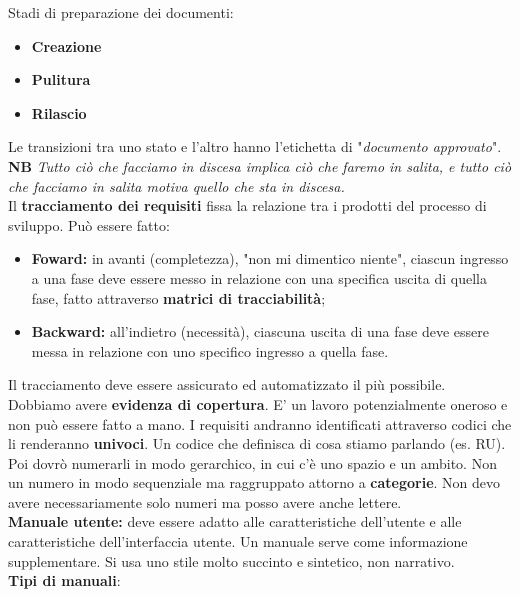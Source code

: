 Stadi di preparazione dei documenti:

\begin{itemize}

	\item \textbf{Creazione}
	\item \textbf{Pulitura}
	\item \textbf{Rilascio}

\end{itemize}

Le transizioni tra uno stato e l'altro hanno l'etichetta di "\textit{documento approvato}".\\
\textbf{NB} \textit{Tutto ciò che facciamo in discesa implica ciò che faremo in salita, e tutto ciò che facciamo in salita motiva quello che sta in discesa.} \\

Il \textbf{tracciamento dei requisiti}  fissa la relazione tra i prodotti del processo di sviluppo. Può essere fatto:

\begin{itemize}

	\item \textbf{Foward:} in avanti (completezza), "non mi dimentico niente", ciascun ingresso a una fase deve essere messo in relazione con una specifica uscita di quella fase, fatto attraverso \textbf{matrici di tracciabilità};
	\item \textbf{Backward:} all'indietro (necessità), ciascuna uscita di una fase deve essere messa in relazione con uno specifico ingresso a quella fase.
\end{itemize}




Il tracciamento deve essere assicurato ed automatizzato il più possibile. Dobbiamo avere \textbf{evidenza di copertura}. E' un lavoro potenzialmente oneroso e non può essere fatto a mano. I requisiti andranno identificati attraverso codici che li renderanno \textbf{univoci}. Un codice che definisca di cosa stiamo parlando (es. RU). Poi dovrò numerarli in modo gerarchico, in cui c'è uno spazio e un ambito. Non un numero in modo sequenziale ma raggruppato attorno a \textbf{categorie}. Non devo avere necessariamente solo numeri ma posso avere anche lettere.\\

\textbf{Manuale utente:} deve essere adatto alle caratteristiche dell'utente e alle caratteristiche dell'interfaccia utente. Un manuale serve come informazione supplementare. Si usa uno stile molto succinto e sintetico, non narrativo. \\
\textbf{Tipi di manuali}:

